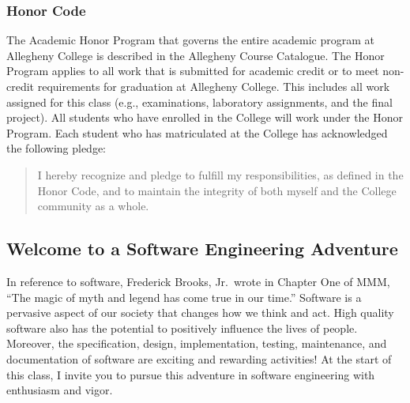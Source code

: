 \subsubsection*{Honor Code}

The Academic Honor Program that governs the entire academic program at Allegheny College is described in the Allegheny
Course Catalogue.  The Honor Program applies to all work that is submitted for academic credit or to meet non-credit
requirements for graduation at Allegheny College.  This includes all work assigned for this class (e.g., examinations,
laboratory assignments, and the final project).  All students who have enrolled in the College will work under the Honor
Program.  Each student who has matriculated at the College has acknowledged the following pledge:

\begin{quote}
I hereby recognize and pledge to fulfill my responsibilities, as defined in the Honor Code, and to maintain the
integrity of both myself and the College community as a whole.  
\end{quote}

\subsection*{Welcome to a Software Engineering Adventure}

In reference to software, Frederick Brooks, Jr.\ wrote in Chapter One of MMM, ``The magic of myth and legend has come true
in our time.'' Software is a pervasive aspect of our society that changes how we think and act.  High quality software
also has the potential to positively influence the lives of people. Moreover, the specification, design, implementation,
testing, maintenance, and documentation of software are exciting and rewarding activities!  At the start of this class,
I invite you to pursue this adventure in software engineering with enthusiasm and vigor.


